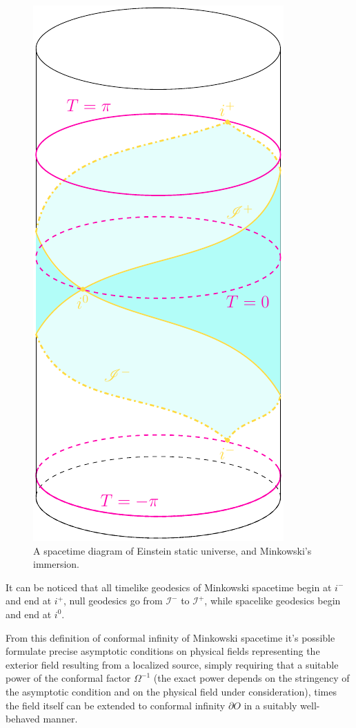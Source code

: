 \begin{figure}
	\centering
	\includegraphics[scale=0.7]{Immagini/Einstein-universe/Einstein-universe.pdf}
	\caption{A spacetime diagram of Einstein static universe, and Minkowski's immersion.}
	\label{fig:Einstein-static-universe}
\end{figure}

It can be noticed that all timelike geodesics of Minkowski spacetime begin at \(i^-\) and end at \(i^+\), null geodesics go from \(\mathscr{I}^-\) to \(\mathscr{I}^+\), while spacelike geodesics begin and end at \(i^0\).

From this definition of conformal infinity of Minkowski spacetime it's possible formulate precise asymptotic conditions on physical fields representing the exterior field resulting from a localized source, simply requiring that a suitable power of the conformal factor \(\Omega^{-1}\) (the exact power depends on the stringency of the asymptotic condition and on the physical field under consideration), times the field itself can be extended to conformal infinity \(\partial O\) in a suitably well-behaved manner.


